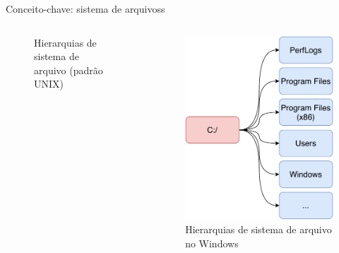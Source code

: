\begin{frame}{Conceito-chave: sistema de arquivoss}
\begin{columns}
\begin{column}{0.5\textwidth}
\begin{figure}
        \caption{Hierarquias de sistema de arquivo (padrão UNIX)}
        \label{fig:my_label}
    \end{figure}
    \end{column}
    \begin{column}{0.5\textwidth}
    \begin{figure}
        \centering
        \includegraphics[scale=0.4]{figuras/windows.pdf}
        \caption{Hierarquias de sistema de arquivo no Windows}
        \label{fig:my_label}
    \end{figure}
    \end{column}
    
    \end{columns}
\end{frame}




 
